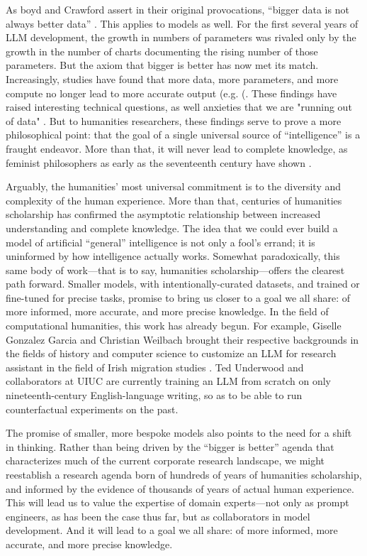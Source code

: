 As boyd and Crawford assert in their original provocations, ``bigger data is not always better data'' \cite{boyd_Crawford_2012}. This applies to models as well. For the first several years of LLM development, the growth in numbers of parameters was rivaled only by the growth in the number of charts documenting the rising number of those parameters. But the axiom that bigger is better has now met its match. Increasingly, studies have found that more data, more parameters, and more compute no longer lead to more accurate output (e.g. (\cite{Zhou_Schellaert_Martínez-Plumed_Moros-Daval_Ferri_Hernández-Orallo_2024,mckenzie_inverse_2024}. These findings have raised interesting technical questions, as well anxieties that we are "running out of data" \cite{noauthor_openai_nodate}. But to humanities researchers, these findings serve to prove a more philosophical point: that the goal of a single universal source of ``intelligence'' is a fraught endeavor. More than that, it will never lead to complete knowledge, as feminist philosophers as early as the seventeenth century have shown \citep{Newcastle_2019, Emecheta_1983, Haraway_1988}. 

Arguably, the humanities’ most universal commitment is to the diversity and complexity of the human experience. More than that, centuries of humanities scholarship has confirmed the asymptotic relationship between increased understanding and complete knowledge. The idea that we could ever build a model of artificial ``general'' intelligence is not only a fool’s errand; it is uninformed by how intelligence actually works. Somewhat paradoxically, this same body of work---that is to say, humanities scholarship---offers the clearest path forward. Smaller models, with intentionally-curated datasets, and trained or fine-tuned for precise tasks, promise to bring us closer to a goal we all share: of more informed, more accurate, and more precise knowledge. In the field of computational humanities, this work has already begun. For example, Giselle Gonzalez Garcia and Christian Weilbach brought their respective backgrounds in the fields of history and computer science to customize an LLM for research assistant in the field of Irish migration studies \cite{Garcia_Weilbach}. Ted Underwood and collaborators at UIUC are currently training an LLM from scratch on only nineteenth-century English-language writing, so as to be able to run counterfactual experiments on the past.

The promise of smaller, more bespoke models also points to the need for a shift in thinking. Rather than being driven by the ``bigger is better'' agenda that characterizes much of the current corporate research landscape, we might reestablish a research agenda born of hundreds of years of humanities scholarship, and informed by the evidence of thousands of years of actual human experience. This will lead us to value the expertise of domain experts---not only as prompt engineers, as has been the case thus far, but as collaborators in model development. And it will lead to a goal we all share: of more informed, more accurate, and more precise knowledge.

